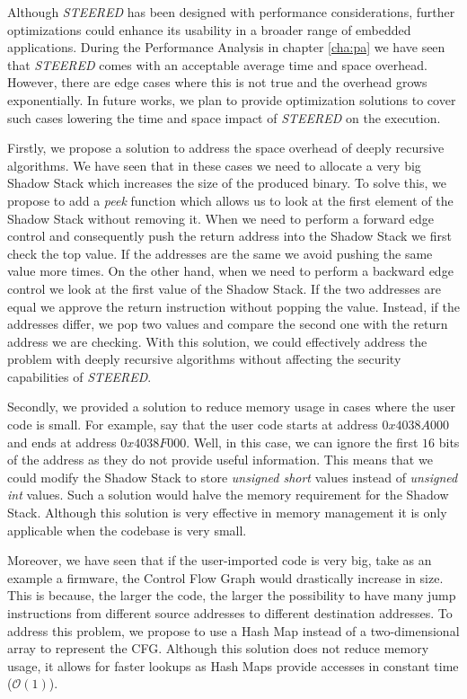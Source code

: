 Although \textit{STEERED} has been designed with performance considerations, further
optimizations could enhance its usability in a broader range of embedded applications.
During the Performance Analysis in chapter \ref{cha:pa} we have seen that
\textit{STEERED} comes with an acceptable average time and space overhead.
However, there are edge cases where this is not true and the overhead grows exponentially.
In future works, we plan to provide optimization solutions to cover such cases lowering
the time and space impact of \textit{STEERED} on the execution.

Firstly, we propose a solution to address the space overhead of deeply recursive
algorithms. We have seen that in these cases we need to allocate a very big
Shadow Stack which increases the size of the produced binary. To solve this, we
propose to add a \textit{peek} function which allows us to look at the first element
of the Shadow Stack without removing it. When we need to perform a forward edge
control and consequently push the return address into the Shadow Stack we first
check the top value. If the addresses are the same we avoid pushing the same value
more times. On the other hand, when we need to perform a backward edge control we
look at the first value of the Shadow Stack. If the two addresses are equal we
approve the return instruction without popping the value. Instead, if the
addresses differ, we pop two values and compare the second one with the return address
we are checking. With this solution, we could effectively address the problem with
deeply recursive algorithms without affecting the security capabilities of \textit{STEERED}.

Secondly, we provided a solution to reduce memory usage in cases where the user code
is small. For example, say that the user code starts at address $0x4038A000$ and
ends at address $0x4038F000$. Well, in this case, we can ignore the first $16$
bits of the address as they do not provide useful information. This means that we
could modify the Shadow Stack to store \textit{unsigned short} values instead of
\textit{unsigned int} values. Such a solution would halve the memory requirement
for the Shadow Stack. Although this solution is very effective in memory management
it is only applicable when the codebase is very small.

Moreover, we have seen that if the user-imported code is very big, take as an example
a firmware, the Control Flow Graph would drastically increase in size. This is because,
the larger the code, the larger the possibility to have many jump instructions from
different source addresses to different destination addresses. To address this
problem, we propose to use a Hash Map instead of a two-dimensional array to represent
the CFG. Although this solution does not reduce memory usage, it allows for faster
lookups as Hash Maps provide accesses in constant time ($\mathcal{O}(1)$).

